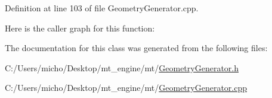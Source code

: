 Definition at line 103 of file Geometry\+Generator.\+cpp.



Here is the caller graph for this function\+:




The documentation for this class was generated from the following files\+:\begin{DoxyCompactItemize}
\item 
C\+:/\+Users/micho/\+Desktop/mt\+\_\+engine/mt/\hyperlink{_geometry_generator_8h}{Geometry\+Generator.\+h}\item 
C\+:/\+Users/micho/\+Desktop/mt\+\_\+engine/mt/\hyperlink{_geometry_generator_8cpp}{Geometry\+Generator.\+cpp}\end{DoxyCompactItemize}
